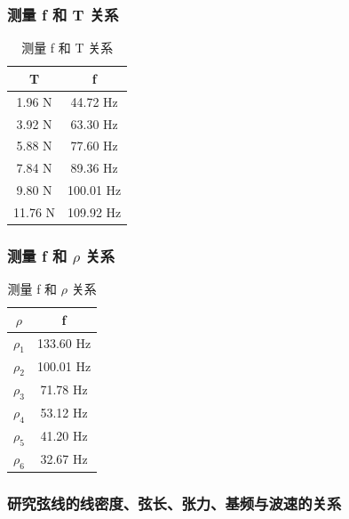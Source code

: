 \documentclass[12pt,a4paper]{amsart}
\begin{document}
\subsubsection{测量 f 和 T 关系}

\begin{table}[H]
    \centering
    \caption{测量 f 和 T 关系}
    \begin{tabular}{cc}
        \toprule
        T & f \\
        \midrule
        1.96 N & 44.72 Hz \\
        3.92 N & 63.30 Hz \\
        5.88 N & 77.60 Hz \\
        7.84 N & 89.36 Hz \\
        9.80 N & 100.01 Hz \\
        11.76 N & 109.92 Hz \\
        \bottomrule
    \end{tabular}
    \label{chart}
\end{table}

\subsubsection{测量 f 和 $\rho$ 关系}

\begin{table}[H]
    \centering
    \caption{测量 f 和 $\rho$ 关系}
    \begin{tabular}{cc}
        \toprule
        $\rho$ & f \\
        \midrule
        $\rho_1$ & 133.60 Hz \\
        $\rho_2$ & 100.01 Hz \\
        $\rho_3$ & 71.78 Hz \\
        $\rho_4$ & 53.12 Hz \\
        $\rho_5$ & 41.20 Hz \\
        $\rho_6$ & 32.67 Hz \\
        \bottomrule
    \end{tabular}
    \label{chart}
\end{table}

\subsubsection{研究弦线的线密度、弦长、张力、基频与波速的关系}
\end{document}
